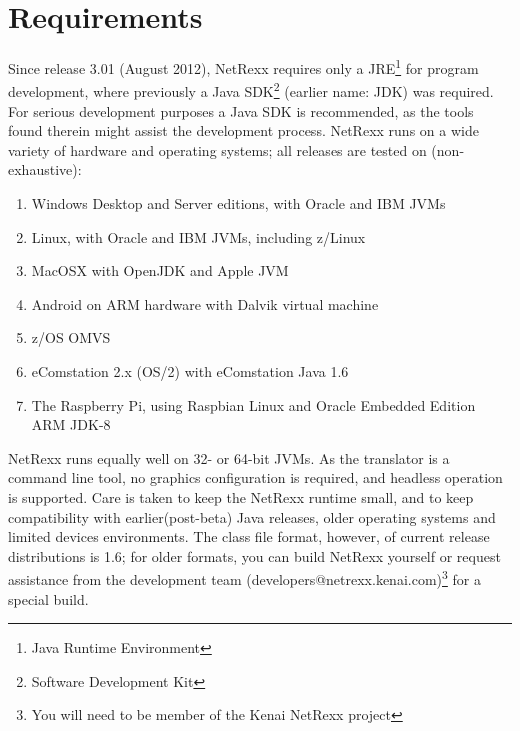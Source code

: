 \chapter{Requirements}
Since release 3.01 (August 2012), NetRexx requires only a
JRE\footnote{Java Runtime Environment} for program development, where previously a
Java SDK\footnote{Software Development Kit} (earlier name: JDK) was required. For serious development
purposes a Java SDK is recommended, as the tools found therein might
assist the development process. NetRexx runs on a wide variety of
hardware and operating systems; all releases are tested on (non-exhaustive):
\begin{enumerate}
\item Windows Desktop and Server editions, with Oracle and IBM JVMs
\item Linux, with Oracle and IBM JVMs, including z/Linux
\item MacOSX with OpenJDK and Apple JVM
\item Android on ARM hardware with Dalvik virtual machine
\item z/OS OMVS
\item eComstation 2.x (OS/2) with eComstation Java 1.6
\item The Raspberry Pi, using Raspbian Linux and Oracle Embedded
  Edition ARM JDK-8
\end{enumerate}
NetRexx runs equally well on 32- or 64-bit JVMs. As the translator is
a command line tool, no graphics configuration is required, and
headless operation is supported. Care is taken to keep the NetRexx runtime small, and to keep
compatibility with earlier(post-beta) Java releases, older operating systems and
limited devices environments. The class file format, however, of
current release distributions is 1.6; for older formats, you
can build NetRexx yourself or request assistance from the development
team (\nolinebreak[4]developers@netrexx.kenai.com)\footnote{You will
  need to be member of the Kenai NetRexx project} for a special build.

